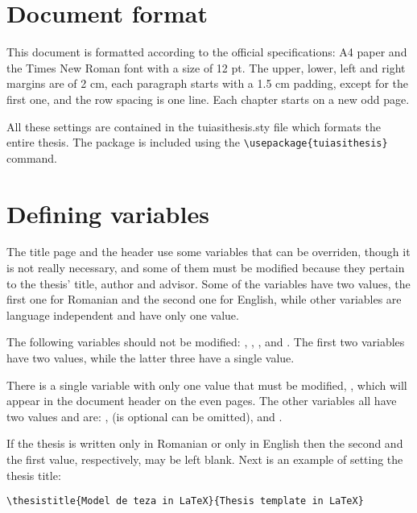 
\section{Document format}
This document is formatted according to the official specifications: A4 paper
and the Times New Roman font with a size of 12 pt.
The upper, lower, left and right margins are of 2 cm, each paragraph starts
with a 1.5 cm padding, except for the first one, and the row spacing is one
line.
Each chapter starts on a new odd page.

All these settings are contained in the tuiasithesis.sty file which formats the
entire thesis. The  package is included using the
\verb?\usepackage{tuiasithesis}? command.

\section{Defining variables}
The title page and the header use some variables that can be overriden,
though it is not really necessary, and some of them must be modified because
they pertain to the thesis' title, author and advisor.
Some of the variables have two values, the first one for Romanian and the
second one for English, while other variables are language independent and have
only one value.

The following variables should not be modified:
, ,
,  and .
The first two variables have two values, while the latter three have a single
value.

There is a single variable with only one value that must be modified, 
, which will appear in the document header on the
even pages. The other variables all have two values and are:
,  (is optional can be omitted),
 and .

If the thesis is written only in Romanian or only in English then the second and
the first value, respectively, may be left blank.
Next is an example of setting the thesis title:

\verb?\thesistitle{Model de teza in LaTeX}{Thesis template in LaTeX}?
